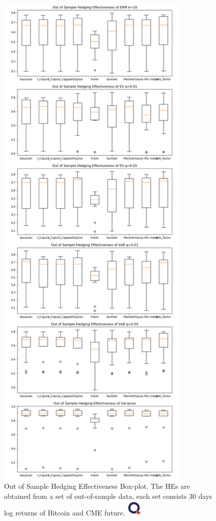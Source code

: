 
\begin{figure}[!th]
   \centering
   \includegraphics[height=25cm]{_pics/Out of Sample Hedging Effectiveness.png}
   \caption{Out of Sample Hedging Effectiveness Box-plot.
   The HEs are obtained from a set of out-of-sample data,
   each set consists 30 days log returns of Bitcoin and CME future.
   \href{http://www.quantlet.com/}{\includegraphics[width=20pt]{_pics/qletlogo_tr.png}}}
   \label{fig:OOSHE}
\end{figure}

